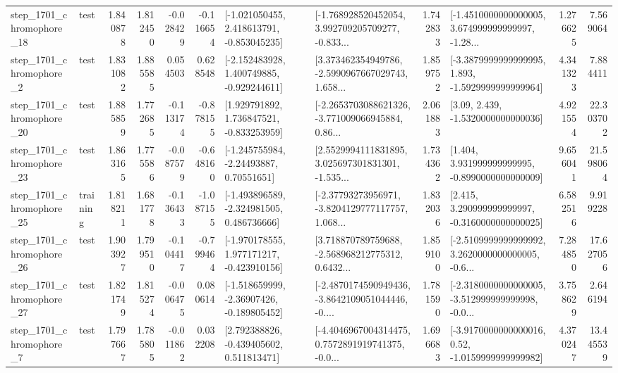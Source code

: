 \begin{tabular}{llrrrrllrlrr}
 step\_1701\_chromophore\_18 &      test &      1.840878 &    1.812450 &     -0.028429 & -0.116654 &   [-1.021050455, 2.418613791, -0.853045235] &  [-1.768928520452054, 3.992709205709277, -0.833... &       1.742833 &  [-1.4510000000000005, 3.674999999999997, -1.28... &            1.276625 &          7.569064 \\
  step\_1701\_chromophore\_2 &      test &      1.831082 &    1.885585 &      0.054503 &  0.628548 &   [-2.152483928, 1.400749885, -0.929244611] &  [3.373462354949786, -2.5990967667029743, 1.658... &       1.859752 &  [-3.3879999999999995, 1.893, -1.5929999999999964] &            4.341323 &          7.884411 \\
 step\_1701\_chromophore\_20 &      test &      1.885859 &    1.772685 &     -0.113174 & -0.878155 &    [1.929791892, 1.736847521, -0.833253959] &  [-2.2653703088621326, -3.771009066945884, 0.86... &       2.061883 &                 [3.09, 2.439, -1.5320000000000036] &            4.921554 &         22.303702 \\
 step\_1701\_chromophore\_23 &      test &      1.863165 &    1.775586 &     -0.087579 & -0.648160 &     [-1.245755984, -2.24493887, 0.70551651] &  [2.5529994111831895, 3.025697301831301, -1.535... &       1.734362 &    [1.404, 3.931999999999995, -0.8990000000000009] &            9.656041 &         21.598064 \\
 step\_1701\_chromophore\_25 &  training &      1.818211 &    1.681778 &     -0.136433 & -1.087155 &   [-1.493896589, -2.324981505, 0.486736666] &  [-2.37793273956971, -3.8204129777117757, 1.068... &       1.832036 &    [2.415, 3.290999999999997, -0.3160000000000025] &            6.582516 &          9.919228 \\
 step\_1701\_chromophore\_26 &      test &      1.903927 &    1.799510 &     -0.104417 & -0.799464 &   [-1.970178555, 1.977171217, -0.423910156] &  [3.718870789759688, -2.568968212775312, 0.6432... &       1.859100 &  [-2.5109999999999992, 3.2620000000000005, -0.6... &            7.284850 &         17.627056 \\
 step\_1701\_chromophore\_27 &      test &      1.821749 &    1.815274 &     -0.006475 &  0.080614 &   [-1.518659999, -2.36907426, -0.189805452] &  [-2.4870174590949436, -3.8642109051044446, -0.... &       1.781590 &  [-2.3180000000000005, -3.512999999999998, -0.0... &            3.758629 &          2.646194 \\
  step\_1701\_chromophore\_7 &      test &      1.797667 &    1.785805 &     -0.011862 &  0.032208 &    [2.792388826, -0.439405602, 0.511813471] &  [-4.4046967004314475, 0.7572891919741375, -0.0... &       1.696683 &   [-3.9170000000000016, 0.52, -1.0159999999999982] &            4.370247 &         13.445539 \\

\end{tabular}
